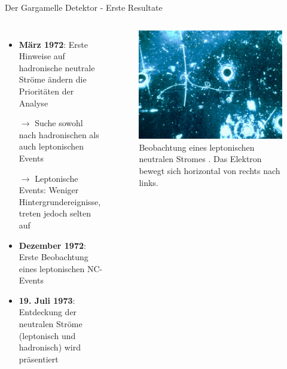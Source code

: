\documentclass[aspectratio=1610, professionalfonts, 10pt]{beamer}
\begin{document}
\begin{frame}{Der Gargamelle Detektor - Erste Resultate}
	\begin{columns}
				\begin{itemize}
					\setlength\itemsep{0.5em}
					\item \textbf{März 1972}: Erste Hinweise auf hadronische neutrale Ströme ändern die Prioritäten der Analyse
					\item[$\rightarrow$] Suche sowohl nach hadronischen als auch leptonischen Events
					\item[$\rightarrow$] Leptonische Events: Weniger Hintergrundereignisse, treten jedoch selten auf
					\item \textbf{Dezember 1972}: Erste Beobachtung eines leptonischen NC-Events
					\item \textbf{19. Juli 1973}: Entdeckung der neutralen Ströme (leptonisch und hadronisch) wird präsentiert
				\end{itemize}

			\begin{figure}
	  			\centering
				\includegraphics[width=\linewidth]{Images/60100_bearbeitet.png}
	  			\caption{Beobachtung eines leptonischen neutralen Stromes \cite{CERN-EX-60100}. Das Elektron bewegt sich horizontal von rechts nach links.}
	  			\label{fig:feynman}
			\end{figure}
	\end{columns}
\end{frame}
\end{document}
